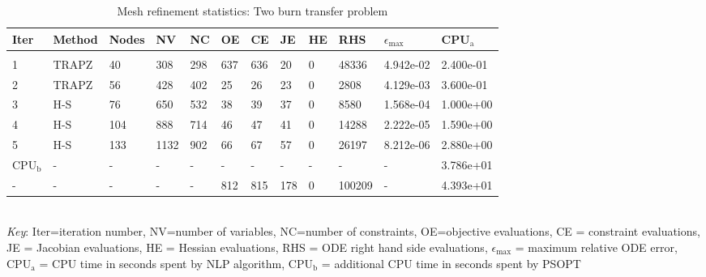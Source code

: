 
\begin{table}
\label{mesh_stats_Two bu}
\tiny
\begin{tabular}{llllllllllll}
Iter&Method&Nodes&NV&NC&OE&CE&JE&HE&RHS&$\epsilon_{\max}$&CPU$_\mathrm{a}$ \\ \hline \\
1&TRAPZ&40&308&298&637&636&20&0&48336&4.942e-02&2.400e-01\\
2&TRAPZ&56&428&402&25&26&23&0&2808&4.129e-03&3.600e-01\\
3&H-S&76&650&532&38&39&37&0&8580&1.568e-04&1.000e+00\\
4&H-S&104&888&714&46&47&41&0&14288&2.222e-05&1.590e+00\\
5&H-S&133&1132&902&66&67&57&0&26197&8.212e-06&2.880e+00\\
\hline
CPU$_\mathrm{b}$ &-&-&-&-&-&-&-&-&-&-&3.786e+01\\
-&-&-&-&-&812&815&178&0&100209&-&4.393e+01\\
\end{tabular}
\newline \\ \emph{Key}: Iter=iteration number, NV=number of variables, NC=number of constraints, OE=objective evaluations,  	              CE = constraint evaluations, JE = Jacobian evaluations, HE = Hessian evaluations, RHS = ODE right hand side 		      evaluations, $\epsilon_{\max}$ = maximum relative ODE error, CPU$_\mathrm{a}$ = CPU time in seconds spent by NLP algorithm, 		      CPU$_\mathrm{b}$ = additional CPU time in seconds spent by PSOPT
\normalsize
\caption{Mesh refinement statistics: Two burn transfer problem}
\end{table}
